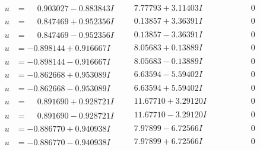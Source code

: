 \documentclass[1p]{elsarticle_modified}
\theoremstyle{definition}
\begin{document}
$$\begin{array}{c|c|c}
\begin{aligned}
u &= \phantom{-}0.903027 - 0.883843 I\end{aligned}
 & \phantom{-}7.77793 + 3.11403 I & \phantom{-0.000000 } 0 \\ \hline\begin{aligned}
u &= \phantom{-}0.847469 + 0.952356 I\end{aligned}
 & \phantom{-}0.13857 + 3.36391 I & \phantom{-0.000000 } 0 \\ \hline\begin{aligned}
u &= \phantom{-}0.847469 - 0.952356 I\end{aligned}
 & \phantom{-}0.13857 - 3.36391 I & \phantom{-0.000000 } 0 \\ \hline\begin{aligned}
u &= -0.898144 + 0.916667 I\end{aligned}
 & \phantom{-}8.05683 + 0.13889 I & \phantom{-0.000000 } 0 \\ \hline\begin{aligned}
u &= -0.898144 - 0.916667 I\end{aligned}
 & \phantom{-}8.05683 - 0.13889 I & \phantom{-0.000000 } 0 \\ \hline\begin{aligned}
u &= -0.862668 + 0.953089 I\end{aligned}
 & \phantom{-}6.63594 - 5.59402 I & \phantom{-0.000000 } 0 \\ \hline\begin{aligned}
u &= -0.862668 - 0.953089 I\end{aligned}
 & \phantom{-}6.63594 + 5.59402 I & \phantom{-0.000000 } 0 \\ \hline\begin{aligned}
u &= \phantom{-}0.891690 + 0.928721 I\end{aligned}
 & \phantom{-}11.67710 + 3.29120 I & \phantom{-0.000000 } 0 \\ \hline\begin{aligned}
u &= \phantom{-}0.891690 - 0.928721 I\end{aligned}
 & \phantom{-}11.67710 - 3.29120 I & \phantom{-0.000000 } 0 \\ \hline\begin{aligned}
u &= -0.886770 + 0.940938 I\end{aligned}
 & \phantom{-}7.97899 - 6.72566 I & \phantom{-0.000000 } 0 \\ \hline\begin{aligned}
u &= -0.886770 - 0.940938 I\end{aligned}
 & \phantom{-}7.97899 + 6.72566 I & \phantom{-0.000000 } 0 \\ \hline\begin{aligned}

\end{aligned}
\end{array}$$
\end{document}
